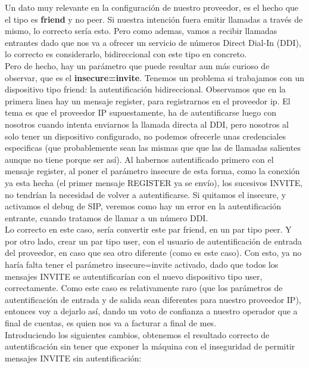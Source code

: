 Un dato muy relevante en la configuración de nuestro proveedor, es el hecho que el tipo es \textbf{friend} y no peer. Si nuestra intención fuera emitir llamadas a través de mismo, lo correcto sería esto. Pero como ademas, vamos a recibir llamadas entrantes dado que nos va a ofrecer un servicio de números Direct Dial-In (DDI), lo correcto es considerarlo, bidireccional con este tipo en concreto.\\

Pero de hecho, hay un parámetro que puede resultar aun más curioso de observar, que es el \textbf{insecure=invite}. Tenemos un problema si trabajamos con un dispositivo tipo friend: la autentificación bidireccional. Observamos que en la primera linea hay un mensaje register, para registrarnos en el proveedor ip. El tema es que el proveedor IP supuestamente, ha de autentificarse luego con nosotros cuando intenta enviarnos la llamada directa al DDI, pero nosotros al solo tener un dispositivo configurado, no podemos ofrecerle unas credenciales especificas (que probablemente sean las mismas que que las de llamadas salientes aunque no tiene porque ser así). Al habernos autentificado primero con el mensaje register, al poner el parámetro insecure de esta forma, como la conexión ya esta hecha (el primer mensaje REGISTER ya se envío), los sucesivos INVITE, no tendrían la necesidad de volver a autentificarse. Si quitamos el insecure, y activamos el debug de SIP, veremos como hay un error en la autentificación entrante, cuando tratamos de llamar a un número DDI.\\

Lo correcto en este caso, sería convertir este par friend, en un par tipo peer. Y por otro lado, crear un par tipo user, con el usuario de autentificación de entrada del proveedor, en caso que sea otro diferente (como es este caso). Con esto, ya no haría falta tener el parámetro insecure=invite activado, dado que todos los mensajes INVITE se autentificarían con el nuevo dispositivo tipo user, correctamente. Como este caso es relativamente raro (que los parámetros de autentificación de entrada y de salida sean diferentes para nuestro proveedor IP), entonces voy a dejarlo así, dando un voto de confianza a nuestro operador que a final de cuentas, es quien nos va a facturar a final de mes.\\

Introduciendo los siguientes cambios, obtenemos el resultado correcto de autentificación sin tener que exponer la máquina con el inseguridad de permitir mensajes INVITE sin autentificación:\\

